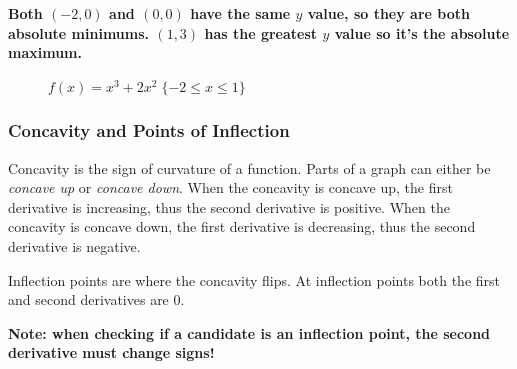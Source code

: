\documentclass[12pt]{article}
\begin{document}
\noindent \textbf{Both $(-2, 0)$ and $(0, 0)$ have the same $y$ value, so they are both absolute minimums. $(1, 3)$ has the greatest $y$ value so it's the absolute maximum.}
\begin{figure}[H]
	\begin{center}
		\caption{$f(x) = x^3 + 2x^2 \; \{-2 \le x \le 1 \}$}
		\label{fig:absextremaclosed}
	\end{center}
\end{figure}

\subsubsection{Concavity and Points of Inflection}
Concavity is the sign of curvature of a function. Parts of a graph can either be \textit{concave up} or \textit{concave down}. When the concavity is concave up, the first derivative is increasing, thus the second derivative is positive. When the concavity is concave down, the first derivative is decreasing, thus the second derivative is negative.

Inflection points are where the concavity flips. At inflection points both the first and second derivatives are $0$.

\noindent \textbf{Note: when checking if a candidate is an inflection point, the second derivative must change signs!}
\end{document}
